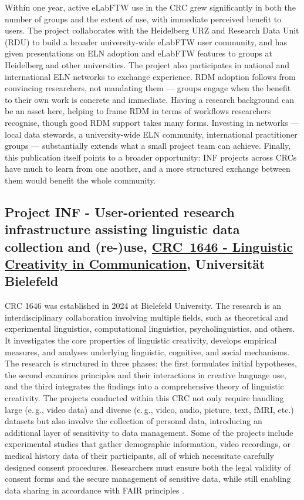 \documentclass{eceasst}
\newcommand{\eg}{e.\,g.}
\begin{document}
Within one year, active eLabFTW use in the CRC grew significantly in both the number of groups and the extent of use, with immediate perceived benefit to users.
The project collaborates with the Heidelberg URZ and Research Data Unit (RDU) to build a broader university-wide eLabFTW user community, and has given presentations on ELN adoption and eLabFTW features to groups at Heidelberg and other universities.
The project also participates in national and international ELN networks to exchange experience.
RDM adoption follows from convincing researchers, not mandating them --- groups engage when the benefit to their own work is concrete and immediate.
Having a research background can be an asset here, helping to frame RDM in terms of workflows researchers recognise, though good RDM support takes many forms.
Investing in networks --- local data stewards, a university-wide ELN community, international practitioner groups --- substantially extends what a small project team can achieve.
Finally, this publication itself points to a broader opportunity: INF projects across CRCs have much to learn from one another, and a more structured exchange between them would benefit the whole community.

\subsection{Project INF - User-oriented research infrastructure assisting linguistic data collection and (re-)use, \href{https://www.uni-bielefeld.de/sfb/sfb1646/}{CRC~1646 -  Linguistic Creativity in Communication}, Universität Bielefeld}
CRC 1646 was established in 2024 at Bielefeld University.
The research is an interdisciplinary collaboration involving multiple fields, such as theoretical and experimental linguistics, computational linguistics, psycholinguistics, and others.
It investigates the core properties of linguistic creativity, develops empirical measures, and analyses underlying linguistic, cognitive, and social mechanisms. The research is structured in three phases: the first formulates initial hypotheses, the second examines principles and their interactions in creative language use, and the third integrates the findings into a comprehensive theory of linguistic creativity.
The projects conducted within this CRC not only require handling large (\eg, video data) and diverse (\eg, video, audio, picture, text, fMRI, etc.) datasets but also involve the collection of personal data, introducing an additional layer of sensitivity to data management.
Some of the projects include experimental studies that gather demographic information, video recordings, or medical history data of their participants, all of which necessitate carefully designed consent procedures.
Researchers must ensure both the legal \cite{GDPR2016} validity of consent forms and the secure management of sensitive data, while still enabling data sharing in accordance with FAIR principles \cite{WilkinsonDumontier2016}.
\end{document}
